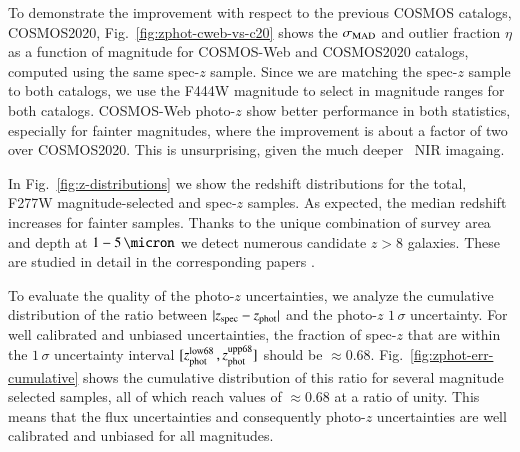 \documentclass[longauth]{aa}
\begin{document}
To demonstrate the improvement with respect to the previous COSMOS catalogs, COSMOS2020, Fig.~\ref{fig:zphot-cweb-vs-c20} shows the $\sigma_{\rm MAD}$ and outlier fraction $\eta$ as a function of magnitude for COSMOS-Web and COSMOS2020 catalogs, computed using the same spec-$z$ sample. Since we are matching the spec-$z$ sample to both catalogs, we use the F444W magnitude to select in magnitude ranges for both catalogs. COSMOS-Web photo-$z$ show better performance in both statistics, especially for fainter magnitudes, where the improvement is about a factor of two over COSMOS2020. This is unsurprising, given the much deeper \JWST\ NIR imagaing. 

In Fig.~\ref{fig:z-distributions} we show the redshift distributions for the total, F277W magnitude-selected and spec-$z$ samples. As expected, the median redshift increases for fainter samples. Thanks to the unique combination of survey area and depth at $1-5 \, \si{\micron}$ we detect numerous candidate $z>8$ galaxies. These are studied in detail in the corresponding papers \citep[][also Franco et al. in prep]{Casey2024, Franco2024, Shuntov2024, Paquereau2025}.

To evaluate the quality of the photo-$z$ uncertainties, we analyze the cumulative distribution of the ratio between $|z_{\rm spec} - z_{\rm phot}|$ and the photo-$z$ $1\,\sigma$ uncertainty. For well calibrated and unbiased uncertainties, the fraction of spec-$z$ that are within the $1\,\sigma$ uncertainty interval $[z_{\rm phot}^{\rm low 68}\, , z_{\rm phot}^{\rm upp 68}]$ should be $\approx 0.68$. Fig.~\ref{fig:zphot-err-cumulative} shows the cumulative distribution of this ratio for several magnitude selected samples, all of which reach values of $\approx 0.68$ at a ratio of unity.
This means that the flux uncertainties and consequently photo-$z$ uncertainties are well calibrated and unbiased for all magnitudes.
\end{document}
